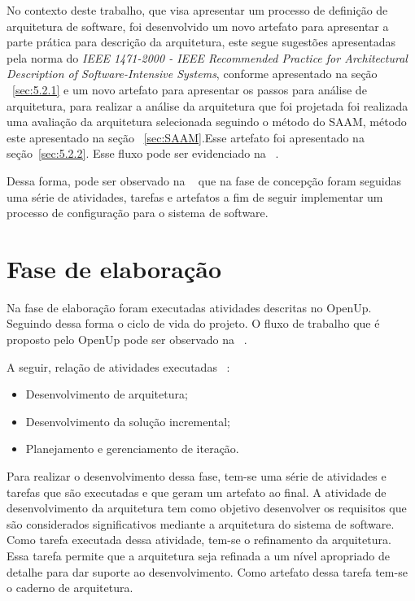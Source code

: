 No contexto deste trabalho, que visa apresentar um processo de definição de arquitetura de software, foi desenvolvido um novo artefato para apresentar a parte prática para descrição da arquitetura, este segue sugestões apresentadas pela norma do \emph{IEEE 1471-2000 - IEEE Recommended Practice for Architectural Description of Software-Intensive Systems}, conforme apresentado na seção ~\ref{sec:5.2.1} e um novo artefato para apresentar os passos para análise de arquitetura, para realizar a análise da arquitetura que foi projetada foi realizada uma avaliação da arquitetura selecionada seguindo o método do \acrfull{SAAM}, método este apresentado na seção ~\ref{sec:SAAM}.Esse artefato foi apresentado na seção~\ref{sec:5.2.2}.
Esse fluxo pode ser evidenciado na ~.

%

%

Dessa forma, pode ser observado na ~ que na fase de concepção foram seguidas uma série de atividades, tarefas e artefatos a fim de seguir implementar um processo de configuração para o sistema de software.

\section{Fase de elaboração}
Na fase de elaboração foram executadas atividades descritas no \acrfull{OpenUp}. Seguindo dessa forma o ciclo de vida do projeto. O fluxo de trabalho que é proposto pelo \acrfull{OpenUp} pode ser observado na ~.

%

A seguir, relação de atividades executadas ~\cite{openup}:

\begin{itemize}
    \item Desenvolvimento de arquitetura;
    \item Desenvolvimento da solução incremental;
    \item Planejamento e gerenciamento de iteração.
\end{itemize}

Para realizar o desenvolvimento dessa fase, tem-se uma série de atividades e tarefas que são executadas e que geram um artefato ao final. 
A atividade de desenvolvimento da arquitetura tem como objetivo desenvolver os requisitos que são considerados significativos mediante a arquitetura do sistema de software. Como tarefa executada dessa atividade, tem-se o refinamento da arquitetura.
Essa tarefa permite que a arquitetura seja refinada a um nível apropriado de detalhe para dar suporte ao desenvolvimento. Como artefato dessa tarefa tem-se o caderno de arquitetura.

